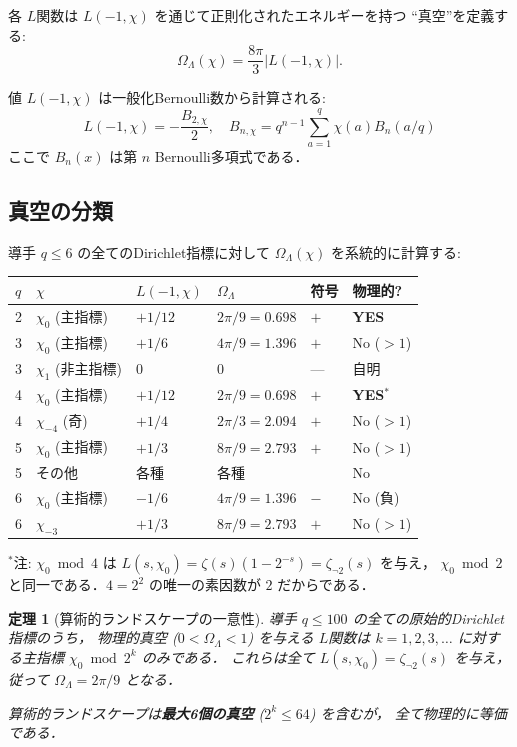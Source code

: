 \documentclass[11pt,a4paper]{article}
\newtheorem{theorem}{定理}
\begin{document}
各 $L$関数は $L(-1, \chi)$ を通じて正則化されたエネルギーを持つ
``真空''を定義する:
\begin{equation}\label{eq:omega-chi}
\Omega_\Lambda(\chi) = \frac{8\pi}{3}|L(-1, \chi)|.
\end{equation}

値 $L(-1, \chi)$ は一般化Bernoulli数から計算される:
\begin{equation}
L(-1, \chi) = -\frac{B_{2,\chi}}{2}, \quad
B_{n,\chi} = q^{n-1}\sum_{a=1}^{q}\chi(a)B_n(a/q)
\end{equation}
ここで $B_n(x)$ は第 $n$ Bernoulli多項式である．

\subsection{真空の分類}

導手 $q \leq 6$ の全てのDirichlet指標に対して
$\Omega_\Lambda(\chi)$ を系統的に計算する:

\begin{center}
\small
\begin{tabular}{llllll}
\toprule
$q$ & $\chi$ & $L(-1,\chi)$ & $\Omega_\Lambda$ & 符号 & 物理的? \\
\midrule
2 & $\chi_0$ (主指標) & $+1/12$ & $2\pi/9 = 0.698$ & $+$ & \textbf{YES} \\
3 & $\chi_0$ (主指標) & $+1/6$ & $4\pi/9 = 1.396$ & $+$ & No ($>1$) \\
3 & $\chi_1$ (非主指標) & $0$ & $0$ & --- & 自明 \\
4 & $\chi_0$ (主指標) & $+1/12$ & $2\pi/9 = 0.698$ & $+$ & \textbf{YES}$^*$ \\
4 & $\chi_{-4}$ (奇) & $+1/4$ & $2\pi/3 = 2.094$ & $+$ & No ($>1$) \\
5 & $\chi_0$ (主指標) & $+1/3$ & $8\pi/9 = 2.793$ & $+$ & No ($>1$) \\
5 & その他 & 各種 & 各種 & & No \\
6 & $\chi_0$ (主指標) & $-1/6$ & $4\pi/9 = 1.396$ & $-$ & No (負) \\
6 & $\chi_{-3}$ & $+1/3$ & $8\pi/9 = 2.793$ & $+$ & No ($>1$) \\
\bottomrule
\end{tabular}
\end{center}

$^*$注: $\chi_0 \bmod 4$ は
$L(s,\chi_0) = \zeta(s)(1-2^{-s}) = \zeta_{\neg 2}(s)$ を与え，
$\chi_0 \bmod 2$ と同一である．$4 = 2^2$ の唯一の素因数が $2$ だからである．

\begin{theorem}[算術的ランドスケープの一意性]
\label{th:unique-landscape}
導手 $q \leq 100$ の全ての原始的Dirichlet指標のうち，
物理的真空 ($0 < \Omega_\Lambda < 1$) を与える $L$関数は
$k = 1, 2, 3, \ldots$ に対する主指標 $\chi_0 \bmod 2^k$ のみである．
これらは全て $L(s, \chi_0) = \zeta_{\neg 2}(s)$ を与え，
従って $\Omega_\Lambda = 2\pi/9$ となる．

算術的ランドスケープは\textbf{最大6個の真空} ($2^k \leq 64$) を含むが，
全て物理的に等価である．
\end{theorem}
\end{document}
